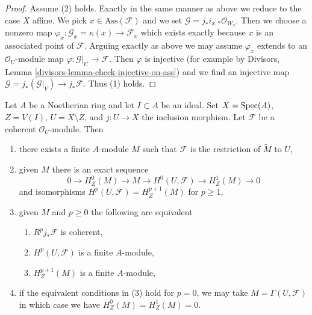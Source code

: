 \begin{proof}
\medskip\noindent
Assume (2) holds. Exactly in the same manner as above we reduce
to the case $X$ affine. We pick $x \in \text{Ass}(\mathcal{F})$
and we set $\mathcal{G} = j_*i_{x, *}\mathcal{O}_{W_x}$.
Then we choose a nonzero map
$\varphi_x : \mathcal{G}_x = \kappa(x) \to \mathcal{F}_x$
which exists exactly because $x$ is an associated point of $\mathcal{F}$.
Arguing exactly as above we may assume $\varphi_x$
extends to an $\mathcal{O}_U$-module map
$\varphi : \mathcal{G}|_U \to \mathcal{F}$.
Then $\varphi$ is injective (for example by
Divisors, Lemma \ref{divisors-lemma-check-injective-on-ass})
and we find an injective map
$\mathcal{G} = j_*(\mathcal{G}|_V) \to j_*\mathcal{F}$.
Thus (1) holds.
\end{proof}

\begin{lemma}
\label{lemma-finiteness-pushforwards-and-H1-local}
Let $A$ be a Noetherian ring and let $I \subset A$ be an ideal.
Set $X = \mathop{\mathrm{Spec}}(A)$, $Z = V(I)$, $U = X \setminus Z$, and $j : U \to X$
the inclusion morphism. Let $\mathcal{F}$ be a coherent $\mathcal{O}_U$-module.
Then
\begin{enumerate}
\item there exists a finite $A$-module $M$ such that $\mathcal{F}$ is the
restriction of $\widetilde{M}$ to $U$,
\item given $M$ there is an exact sequence
$$
0 \to H^0_Z(M) \to M \to H^0(U, \mathcal{F}) \to H^1_Z(M) \to 0
$$
and isomorphisms $H^p(U, \mathcal{F}) = H^{p + 1}_Z(M)$ for $p \geq 1$,
\item given $M$ and $p \geq 0$ the following are equivalent
\begin{enumerate}
\item $R^pj_*\mathcal{F}$ is coherent,
\item $H^p(U, \mathcal{F})$ is a finite $A$-module,
\item $H^{p + 1}_Z(M)$ is a finite $A$-module,
\end{enumerate}
\item if the equivalent conditions in (3) hold for $p = 0$, we may take
$M = \Gamma(U, \mathcal{F})$ in which case we have $H^0_Z(M) = H^1_Z(M) = 0$.
\end{enumerate}
\end{lemma}

